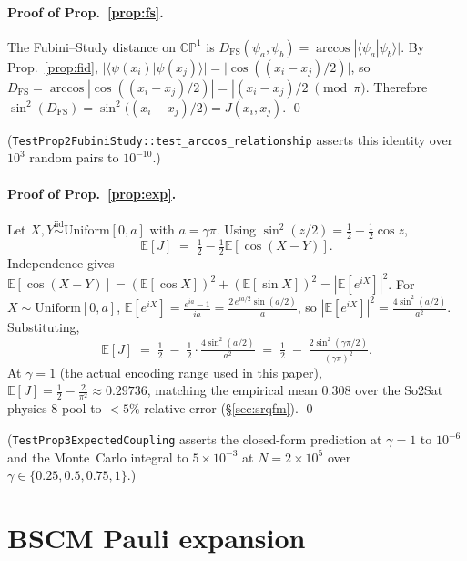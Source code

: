 \documentclass[pdflatex,sn-mathphys-num]{sn-jnl}
\theoremstyle{thmstyleone}
\theoremstyle{thmstyletwo}
\theoremstyle{thmstylethree}
\begin{document}
\paragraph{Proof of Prop.~\ref{prop:fs}.}
The Fubini--Study distance on $\mathbb{CP}^1$ is
$D_{\mathrm{FS}}(\psi_a,\psi_b) = \arccos|\langle\psi_a|\psi_b\rangle|$.
By Prop.~\ref{prop:fid},
$|\langle\psi(x_i)|\psi(x_j)\rangle| = |\cos((x_i-x_j)/2)|$, so
$D_{\mathrm{FS}} = \arccos|\cos((x_i-x_j)/2)| = |(x_i-x_j)/2| \pmod{\pi}$.
Therefore
$\sin^2(D_{\mathrm{FS}}) = \sin^2\!\bigl((x_i-x_j)/2\bigr) = J(x_i,x_j)$. \qed

\noindent (\texttt{TestProp2FubiniStudy::test\_arccos\_relationship}
asserts this identity over $10^{3}$ random pairs to $10^{-10}$.)

\paragraph{Proof of Prop.~\ref{prop:exp}.}
Let $X, Y \stackrel{\mathrm{iid}}{\sim} \mathrm{Uniform}[0, a]$ with
$a = \gamma\pi$. Using $\sin^2(z/2) = \tfrac12 - \tfrac12\cos z$,
\[
\mathbb{E}[J] \;=\; \tfrac12 - \tfrac12 \mathbb{E}[\cos(X - Y)].
\]
Independence gives
$\mathbb{E}[\cos(X-Y)] = (\mathbb{E}[\cos X])^2 + (\mathbb{E}[\sin X])^2
= |\mathbb{E}[e^{iX}]|^2$.
For $X \sim \mathrm{Uniform}[0,a]$,
$\mathbb{E}[e^{iX}] = \tfrac{e^{ia} - 1}{ia}
= \tfrac{2\,e^{ia/2}\sin(a/2)}{a}$, so
$|\mathbb{E}[e^{iX}]|^2 = \tfrac{4\sin^2(a/2)}{a^2}$.
Substituting,
\[
\mathbb{E}[J]
\;=\; \tfrac12 \;-\; \tfrac12 \cdot \tfrac{4\sin^2(a/2)}{a^2}
\;=\; \tfrac12 \;-\; \tfrac{2\sin^2(\gamma\pi/2)}{(\gamma\pi)^2}.
\]
At $\gamma = 1$ (the actual encoding range used in this paper),
$\mathbb{E}[J] = \tfrac12 - \tfrac{2}{\pi^2} \approx 0.29736$,
matching the empirical mean $0.308$ over the So2Sat physics-8 pool to
$<5\%$ relative error (\S\ref{sec:srqfm}). \qed

\noindent (\texttt{TestProp3ExpectedCoupling} asserts the closed-form
prediction at $\gamma=1$ to $10^{-6}$ and the Monte~Carlo integral to
$5\times 10^{-3}$ at $N=2\times 10^{5}$ over $\gamma\in\{0.25,0.5,0.75,1\}$.)

\section{BSCM Pauli expansion}\label{appx:bscm}
\end{document}
